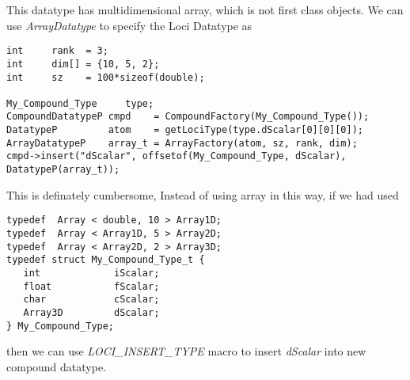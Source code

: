 %
This datatype has multidimensional array, which is not first class
objects. We can use {\em ArrayDatatype} to specify the Loci Datatype as
\begin{verbatim}
int     rank  = 3;
int     dim[] = {10, 5, 2};
int     sz    = 100*sizeof(double);

My_Compound_Type     type;
CompoundDatatypeP cmpd    = CompoundFactory(My_Compound_Type());
DatatypeP         atom    = getLociType(type.dScalar[0][0][0]);
ArrayDatatypeP    array_t = ArrayFactory(atom, sz, rank, dim);
cmpd->insert("dScalar", offsetof(My_Compound_Type, dScalar), DatatypeP(array_t));
\end{verbatim}

This is definately cumbersome, Instead of using array in this way, if
we had used
\begin{verbatim}
typedef  Array < double, 10 > Array1D;
typedef  Array < Array1D, 5 > Array2D;
typedef  Array < Array2D, 2 > Array3D;
typedef struct My_Compound_Type_t {
   int             iScalar;
   float           fScalar;
   char            cScalar;
   Array3D         dScalar;
} My_Compound_Type;
\end{verbatim}
then we can use {\em LOCI\_INSERT\_TYPE} macro to insert {\em
dScalar} into new compound datatype.

%
